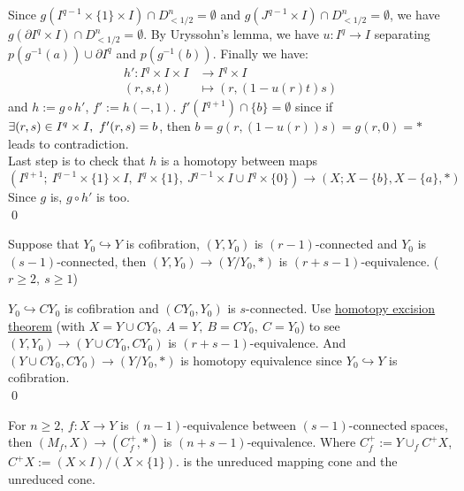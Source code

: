 \begin{prf}
        Since $g(I^{q-1} \times \{1\} \times I) \cap D^n_{<1/2} = \emptyset$
        and $g(J^{q-1} \times I) \cap D^n_{<1/2} = \emptyset$,
        we have $g(\partial I^q \times I) \cap D^n_{<1/2} = \emptyset$.
        By Uryssohn's lemma, we have $u : I^{q} \to I$ separating
        $p(g^{-1}(a)) \cup \partial I^q$ and $p(g^{-1}(b))$.
        Finally we have:
        \begin{align*}
            h' : I^q \times I \times I & \to I^q \times I\\
            (r,s,t) & \mapsto (r,(1-u(r)t)s)
        \end{align*}
        and $h := g \circ h'$, $f' := h(-,1)$.
        $f'(I^{q+1}) \cap \{b\} = \emptyset$ since if
        $\E (r,s) \in I^q \times I, \ f'(r,s)=b$, then
        $b = g(r,(1-u(r))s) = g(r,0) = \ast$ leads to contradiction.\\
        Last step is to check that $h$ is a homotopy between maps 
        $$
        (I^{q+1};\ I^{q-1} \times \{1\} \times I,\ I^q \times \{1\},\  J^{q-1} \times I \cup I^q \times \{0\}) \to (X; X-\{b\}, X-\{a\}, \ast)
        $$
        Since $g$ is, $g \circ h'$ is too.\\
        \qed

    \end{prf}

    \begin{cor}
        Suppose that $Y_0 \hookrightarrow Y$ is cofibration,
        $(Y,Y_0)$ is $(r-1)$-connected and $Y_0$ is $(s-1)$-connected,
        then $(Y,Y_0) \to (Y/Y_0 , \ast)$ is $(r+s-1)$-equivalence.
        ($r \geq 2,\ s \geq 1$)
    \end{cor}

    \begin{prf}
        $Y_0 \hookrightarrow C Y_0$ is cofibration and $(C Y_0 , Y_0)$
        is $s$-connected.
        Use \hyperref[hyp:Homotopy-Excision-Theorem]{homotopy excision theorem} (with
        $X= Y \cup C Y_0,\ A = Y,\ B=C Y_0,\ C = Y_0$)
        to see $(Y,Y_0) \to (Y \cup C Y_0, C Y_0)$
        is $(r+s-1)$-equivalence.
        And $(Y \cup C Y_0, C Y_0) \to (Y/Y_0, \ast)$ is homotopy equivalence
        since $Y_0 \hookrightarrow Y$ is cofibration.\\
        \qed
    \end{prf}

    \begin{cor}
        For $n \geq 2$, $f : X \to Y$ is $(n-1)$-equivalence
        between $(s-1)$-connected spaces,
        then $(M_f,X) \to (C^+_f, \ast)$ is $(n+s-1)$-equivalence.
        Where $C^+_f := Y \cup_f C^+X $, $C^+X := (X \times I) / (X \times \{1\})$.
        is the unreduced mapping cone and the unreduced cone.
    \end{cor}

